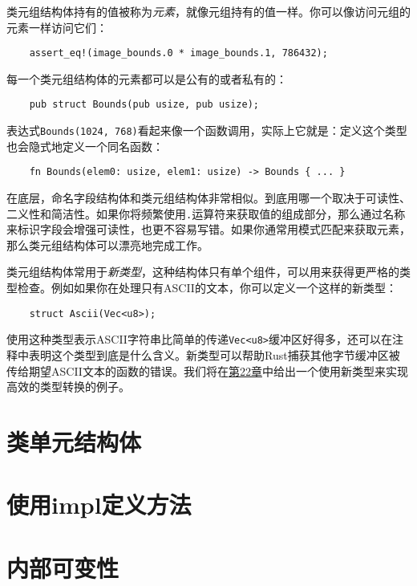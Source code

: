 类元组结构体持有的值被称为\emph{元素}，就像元组持有的值一样。你可以像访问元组的元素一样访问它们：
\begin{verbatim}
    assert_eq!(image_bounds.0 * image_bounds.1, 786432);
\end{verbatim}

每一个类元组结构体的元素都可以是公有的或者私有的：
\begin{verbatim}
    pub struct Bounds(pub usize, pub usize);
\end{verbatim}

表达式\texttt{Bounds(1024, 768)}看起来像一个函数调用，实际上它就是：定义这个类型也会隐式地定义一个同名函数：
\begin{verbatim}
    fn Bounds(elem0: usize, elem1: usize) -> Bounds { ... }
\end{verbatim}

在底层，命名字段结构体和类元组结构体非常相似。到底用哪一个取决于可读性、二义性和简洁性。如果你将频繁使用\texttt{.}运算符来获取值的组成部分，那么通过名称来标识字段会增强可读性，也更不容易写错。如果你通常用模式匹配来获取元素，那么类元组结构体可以漂亮地完成工作。

类元组结构体常用于\emph{新类型}，这种结构体只有单个组件，可以用来获得更严格的类型检查。例如如果你在处理只有ASCII的文本，你可以定义一个这样的新类型：
\begin{verbatim}
    struct Ascii(Vec<u8>);
\end{verbatim}

使用这种类型表示ASCII字符串比简单的传递\texttt{Vec<u8>}缓冲区好得多，还可以在注释中表明这个类型到底是什么含义。新类型可以帮助Rust捕获其他字节缓冲区被传给期望ASCII文本的函数的错误。我们将在\hyperref[ch22]{第22章}中给出一个使用新类型来实现高效的类型转换的例子。

\section{类单元结构体}

\section{使用impl定义方法}\label{method}

\section{内部可变性}\label{intermut}
